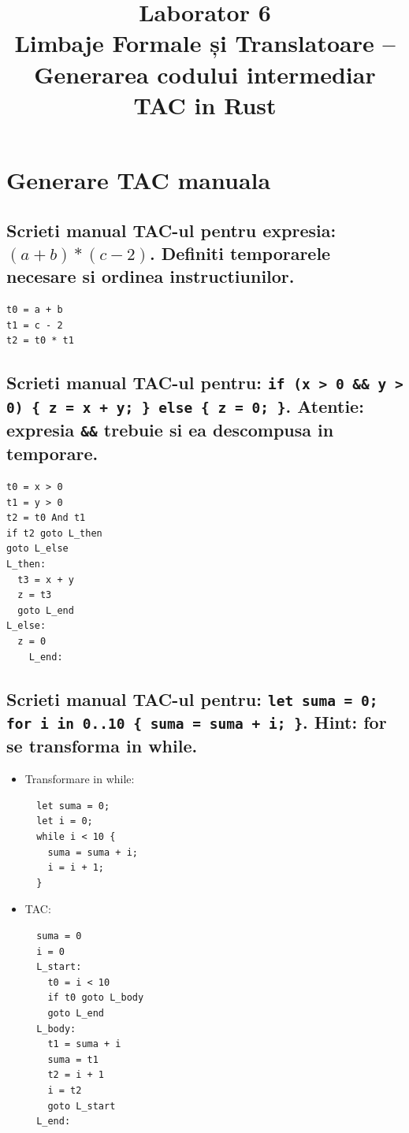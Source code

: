 \documentclass[11pt]{article}
\date{}
\title{Laborator 6\\\medskip
\large Limbaje Formale și Translatoare -- Generarea codului intermediar TAC in Rust}
\begin{document}
\maketitle
\section{Generare TAC manuala}
\label{sec:orgbc47bc8}
\subsection{Scrieti manual TAC-ul pentru expresia: \((a + b) * (c - 2)\). Definiti temporarele necesare si ordinea instructiunilor.}
\label{sec:orga29fecb}
\begin{verbatim}
t0 = a + b
t1 = c - 2
t2 = t0 * t1
\end{verbatim}
\subsection{Scrieti manual TAC-ul pentru: \texttt{if (x > 0 \&\& y > 0) \{ z = x + y; \} else \{ z = 0; \}}. Atentie: expresia \texttt{\&\&} trebuie si ea descompusa in temporare.}
\label{sec:org6d82292}
\begin{verbatim}
t0 = x > 0
t1 = y > 0
t2 = t0 And t1
if t2 goto L_then
goto L_else
L_then:
  t3 = x + y
  z = t3
  goto L_end
L_else:
  z = 0
    L_end:
\end{verbatim}
\subsection{Scrieti manual TAC-ul pentru: \texttt{let suma = 0; for i in 0..10 \{ suma = suma + i; \}}. Hint: for se transforma in while.}
\label{sec:org7c19927}
\begin{itemize}
\item Transformare in while:
\begin{verbatim}
  let suma = 0;
  let i = 0;
  while i < 10 {
    suma = suma + i;
    i = i + 1;
  }
\end{verbatim}

\item TAC:
\begin{verbatim}
  suma = 0
  i = 0
  L_start:
    t0 = i < 10
    if t0 goto L_body
    goto L_end
  L_body:
    t1 = suma + i
    suma = t1
    t2 = i + 1
    i = t2
    goto L_start
  L_end:
\end{verbatim}
\end{itemize}
\end{document}
